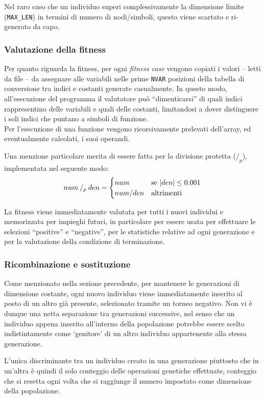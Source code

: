 \documentclass{../llncs}
\DeclarePairedDelimiter{\abs}{\lvert}{\rvert}
\begin{document}
Nel raro caso che un individuo superi complessivamente la dimensione limite (\texttt{MAX{\_}LEN}) in termini di numero di nodi/simboli, questo viene scartato e ri-generato da capo.

\subsubsection{Valutazione della fitness}
Per quanto riguarda la fitness, per ogni \emph{fitness case} vengono copiati i valori -- letti da file -- da assegnare alle variabili nelle prime \texttt{NVAR} posizioni della tabella di conversione tra indici e costanti generate casualmente. In questo modo, all'esecuzione del programma il valutatore può ``dimenticarsi'' di quali indici rappresentino delle variabili e quali delle costanti, limitandosi a dover distinguere i soli indici che puntano a simboli di funzione.\\

Per l'esecuzione di una funzione vengono ricorsivamente prelevati dell'array, ed eventualmente calcolati, i suoi operandi.

Una menzione particolare merita di essere fatta per la divisione protetta ($/_p$), implementata nel seguente modo:
\[
num \: /_p \: den =
\begin{cases}
num & \text{se $\abs{den}\le0.001$} \\
num/den & \text{altrimenti}
\end{cases}
\]

La fitness viene immediatamente valutata per tutti i nuovi individui e memorizzata per impieghi futuri, in particolare per essere usata per effettuare le selezioni ``positive'' e ``negative'', per le statistiche relative ad ogni generazione e per la valutazione della condizione di terminazione.

\subsubsection{Ricombinazione e sostituzione}
Come menzionato nella sezione precedente, per mantenere le generazioni di dimensione costante, ogni nuovo individuo viene immediatamente inserito al posto di un altro già presente, selezionato tramite un torneo negativo. Non vi è dunque una netta separazione tra generazioni successive, nel senso che un individuo appena inserito all'interno della popolazione potrebbe essere scelto indistintamente come `genitore' di un altro individuo appartenente alla stessa generazione.

L'unica discriminante tra un individuo creato in una generazione piuttosto che in un'altra è quindi il solo conteggio delle operazioni genetiche effettuate, conteggio che si resetta ogni volta che si raggiunge il numero impostato come dimensione della popolazione.\\
\end{document}
